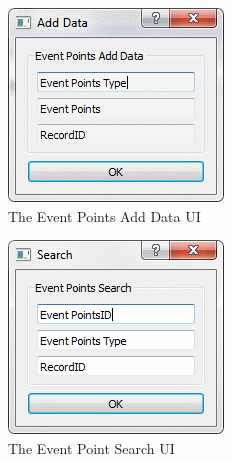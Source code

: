 \begin{figure}
\includegraphics[width=\textwidth]{./Maintenance/UI/EventPointsAD.png}
\caption{The Event Points Add Data UI} \label{fig:EventPointsAD_UI}
\end{figure}

\begin{figure}
\includegraphics[width=\textwidth]{./Maintenance/UI/EventPointsSearch.png}
\caption{The Event Point Search UI} \label{fig:EventPointsSearch_UI}
\end{figure}

